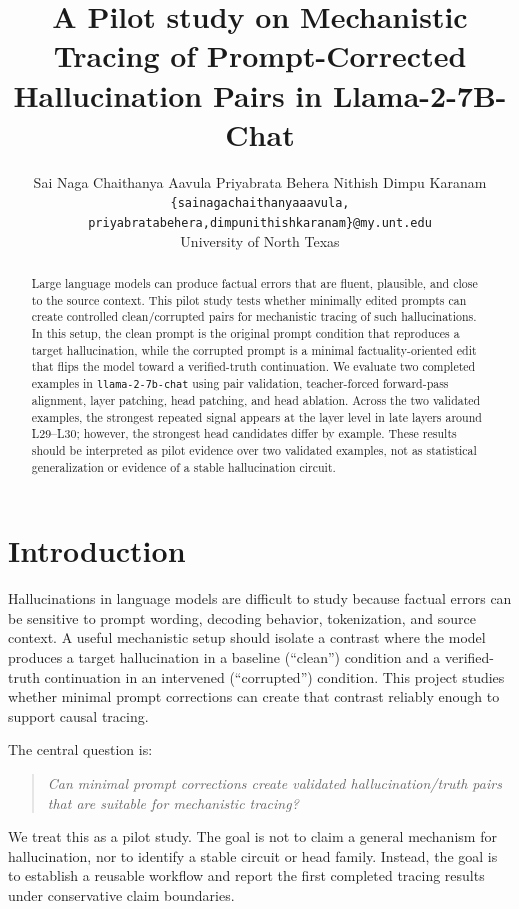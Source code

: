 \documentclass[11pt]{article}
\title{A Pilot study on Mechanistic Tracing of Prompt-Corrected Hallucination Pairs in Llama-2-7B-Chat}
\author{Sai Naga Chaithanya Aavula \quad Priyabrata Behera \quad Nithish Dimpu Karanam \\
\texttt{\{sainagachaithanyaaavula, priyabratabehera,dimpunithishkaranam\}@my.unt.edu} \\
University of North Texas}
\begin{document}
\maketitle

\begin{abstract}
Large language models can produce factual errors that are fluent, plausible, and close to the source context. This pilot study tests whether minimally edited prompts can create controlled clean/corrupted pairs for mechanistic tracing of such hallucinations. In this setup, the clean prompt is the original prompt condition that reproduces a target hallucination, while the corrupted prompt is a minimal factuality-oriented edit that flips the model toward a verified-truth continuation. We evaluate two completed examples in \texttt{llama-2-7b-chat} using pair validation, teacher-forced forward-pass alignment, layer patching, head patching, and head ablation. Across the two validated examples, the strongest repeated signal appears at the layer level in late layers around L29--L30; however, the strongest head candidates differ by example. These results should be interpreted as pilot evidence over two validated examples, not as statistical generalization or evidence of a stable hallucination circuit.
\end{abstract}

\section{Introduction}

Hallucinations in language models are difficult to study because factual errors can be sensitive to prompt wording, decoding behavior, tokenization, and source context. A useful mechanistic setup should isolate a contrast where the model produces a target hallucination in a baseline (``clean'') condition and a verified-truth continuation in an intervened (``corrupted'') condition. This project studies whether minimal prompt corrections can create that contrast reliably enough to support causal tracing.

The central question is:

\begin{quote}
\emph{Can minimal prompt corrections create validated hallucination/truth pairs that are suitable for mechanistic tracing?}
\end{quote}

We treat this as a pilot study. The goal is not to claim a general mechanism for hallucination, nor to identify a stable circuit or head family. Instead, the goal is to establish a reusable workflow and report the first completed tracing results under conservative claim boundaries.
\end{document}
